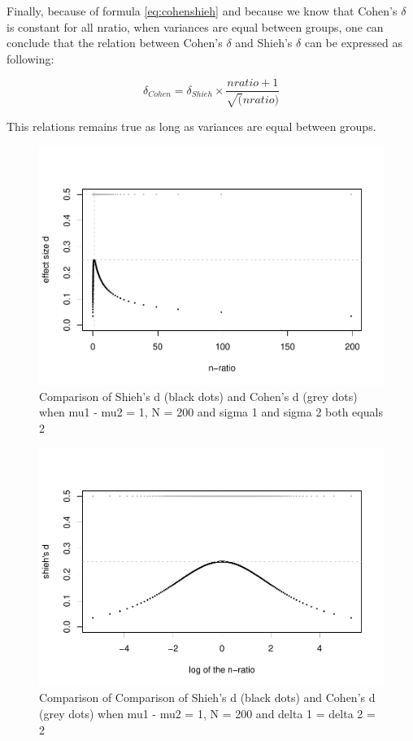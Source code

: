 \documentclass[man]{apa6}
\begin{document}
Finally, because of formula \ref{eq:cohenshieh} and because we know that Cohen's \(\delta\) is constant for all nratio, when variances are equal between groups, one can conclude that the relation between Cohen's \(\delta\) and Shieh's \(\delta\) can be expressed as following:

\begin{equation} 
\delta_{Cohen}= \delta_{Shieh} \times \frac{nratio+1}{\sqrt(nratio)}
\label{eq:shiehvsmax}
\end{equation}

This relations remains true as long as variances are equal between groups.

\begin{figure}
\centering
\includegraphics{Appendix1_files/figure-latex/SHIEH1-1.pdf}
\caption{\label{fig:SHIEH1}Comparison of Shieh's d (black dots) and Cohen's d (grey dots) when mu1 - mu2 = 1, N = 200 and sigma 1 and sigma 2 both equals 2}
\end{figure}

\begin{figure}
\centering
\includegraphics{Appendix1_files/figure-latex/SHIEH2-1.pdf}
\caption{\label{fig:SHIEH2}Comparison of Comparison of Shieh's d (black dots) and Cohen's d (grey dots) when mu1 - mu2 = 1, N = 200 and delta 1 = delta 2 = 2}
\end{figure}
\end{document}
